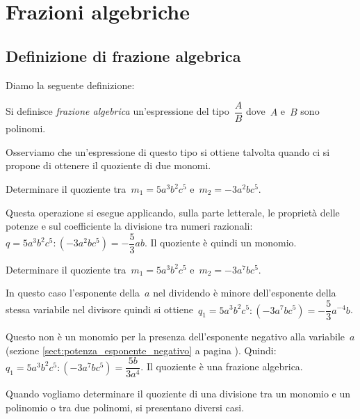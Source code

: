 
\chapter{Frazioni algebriche}

\section{Definizione di frazione algebrica}

Diamo la seguente definizione:
\begin{definizione}
Si definisce \emph{frazione algebrica} un'espressione del tipo~$\dfrac{A}{B}$ dove~$A$ e~$B$ sono polinomi.
\end{definizione}
Osserviamo che un'espressione di questo tipo si ottiene talvolta quando ci si propone di ottenere il quoziente di due monomi.

\begin{exrig}
 \begin{esempio}
Determinare il quoziente tra~$m_{1}=5a^{3}b^{2}c^{5}$ e~$m_{2}=-3a^{2}bc^{5}$.

Questa operazione si esegue applicando, sulla parte letterale, le proprietà delle potenze e sul coefficiente la divisione tra numeri
razionali:~$q=5a^{3}b^{2}c^{5}:\left(-3a^{2}bc^{5}\right)=-{\dfrac{5}{3}}ab$.
Il quoziente è quindi un monomio.
 \end{esempio}

 \begin{esempio}
Determinare il quoziente tra~$m_{1}=5a^{3}b^{2}c^{5}$ e~$m_{2}=-3a^{7}bc^{5}$.

In questo caso l'esponente della~$a$ nel dividendo è minore dell'esponente della stessa variabile nel divisore quindi
si ottiene~$q_{1}=5a^{3}b^{2}c^{5}:\left(-3a^{7}bc^{5}\right)=-{\dfrac{5}{3}}a^{-4}b$. 

Questo non è un monomio per la presenza dell'esponente
negativo alla variabile~$a$ (sezione \ref{sect:potenza_esponente_negativo} a pagina \pageref{sect:potenza_esponente_negativo}).
Quindi:~$q_{1}=5a^{3}b^{2}c^{5}:\left(-3a^{7}bc^{5}\right)={\dfrac{5b}{3a^{4}}}$. Il quoziente è una frazione algebrica.
 \end{esempio}
\end{exrig}

Quando vogliamo determinare il quoziente di una divisione tra un monomio e un polinomio o tra due polinomi, si presentano diversi casi.


